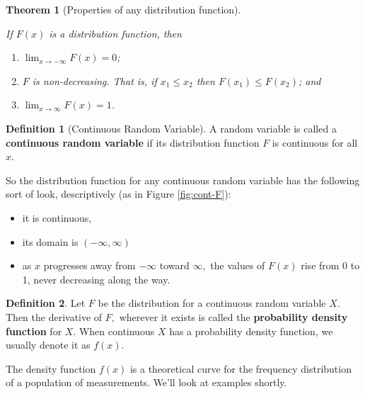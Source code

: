 \documentclass[
]{book}
\providecommand{\tightlist}{%
  \setlength{\itemsep}{0pt}\setlength{\parskip}{0pt}}
\newtheorem{theorem}{Theorem}[chapter]
\theoremstyle{definition}
\newtheorem{definition}{Definition}[chapter]
\theoremstyle{definition}
\theoremstyle{definition}
\theoremstyle{definition}
\theoremstyle{remark}
\begin{document}
\begin{theorem}[Properties of any distribution function]
\protect\hypertarget{thm:dist-fcn-props}{}\label{thm:dist-fcn-props}

If \(F(x)\) is a distribution function, then

\begin{enumerate}
\def\labelenumi{\alph{enumi})}
\tightlist
\item
  \(\displaystyle \lim_{x \to -\infty} F(x) = 0\);
\item
  \(F\) is non-decreasing. That is, if \(x_1 \leq x_2\) then \(F(x_1) \leq F(x_2)\); and
\item
  \(\displaystyle \lim_{x \to \infty} F(x) = 1\).
\end{enumerate}

\end{theorem}

\begin{definition}[Continuous Random Variable]
\protect\hypertarget{def:continuous-rv}{}\label{def:continuous-rv}A random variable is called a \textbf{continuous random variable} if its distribution function \(F\) is continuous for all \(x\).
\end{definition}

So the distribution function for any continuous random variable has the following sort of look, descriptively (as in Figure \ref{fig:cont-F}):

\begin{itemize}
\tightlist
\item
  it is continuous,
\item
  its domain is \((-\infty,\infty)\)
\item
  as \(x\) progresses away from \(-\infty\) toward \(\infty,\) the values of \(F(x)\) rise from 0 to 1, never decreasing along the way.
\end{itemize}

\begin{definition}
\protect\hypertarget{def:pdf-continuous-RV}{}\label{def:pdf-continuous-RV}Let \(F\) be the distribution for a continuous random variable \(X\). Then the derivative of \(F,\) wherever it exists is called the \textbf{probability density function} for \(X\). When continuous \(X\) has a probability density function, we usually denote it as \(f(x)\).
\end{definition}

The density function \(f(x)\) is a theoretical curve for the frequency distribution of a population of measurements. We'll look at examples shortly.
\end{document}
